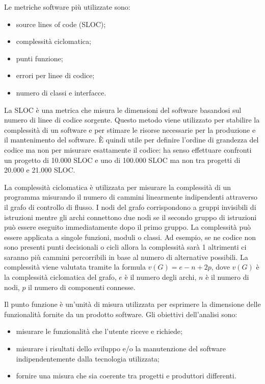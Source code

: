 Le metriche software più utilizzate sono:
\begin{itemize}
\item source lines of code (SLOC);
\item complessità ciclomatica;
\item punti funzione;
\item errori per linee di codice;
\item numero di classi e interfacce.
\end{itemize}

La SLOC è una metrica che misura le dimensioni del software basandosi sul numero di linee di codice sorgente. Questo metodo viene utilizzato per stabilire la complessità di un software e per stimare le risorse necessarie per la produzione e il mantenimento del software. \`E quindi utile per definire l'ordine di grandezza del codice ma non per misurare esattamente il codice: ha senso effettuare confronti un progetto di 10.000 SLOC e uno di 100.000 SLOC ma non tra progetti di 20.000 e 21.000 SLOC.

La complessità ciclomatica è utilizzata per misurare la complessità di un programma misurando il numero di cammini linearmente indipendenti attraverso il grafo di controllo di flusso. I nodi del grafo corrispondono a gruppi invisibili di istruzioni mentre gli archi connettono due nodi se il secondo gruppo di istruzioni può essere eseguito immediatamente dopo il primo gruppo. La complessità può essere applicata a singole funzioni, moduli o classi.
Ad esempio, se ne codice non sono presenti punti decisionali o cicli allora la complessità sarà 1 altrimenti ci saranno più cammini percorribili in base al numero di alternative possibili.
La complessità viene valutata tramite la formula $v(G) = e - n + 2p$, dove $v(G)$ è la complessità ciclomatica del grafo, $e$ è il numero degli archi, $n$ è il numero di nodi, $p$ il numero di componenti connesse.

Il punto funzione è un'unità di misura utilizzata per esprimere la dimensione delle funzionalità fornite da un prodotto software.
Gli obiettivi dell'analisi sono:
\begin{itemize}
\item misurare le funzionalità che l'utente riceve e richiede;
\item misurare i risultati dello sviluppo e/o la manutenzione del software indipendentemente dalla tecnologia utilizzata;
\item fornire una misura che sia coerente tra progetti e produttori differenti.
\end{itemize}


